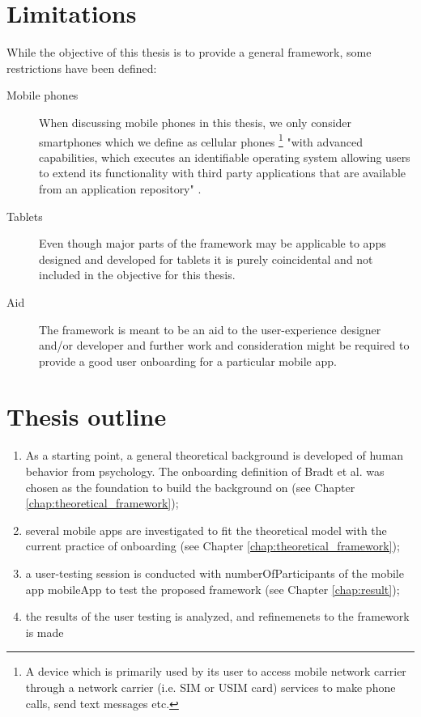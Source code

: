 \section{Limitations}
While the objective of this thesis is to provide a general framework, some restrictions have been defined:
\begin{description}
  \item[Mobile phones] When discussing mobile phones in this thesis, we only consider smartphones which we define as cellular phones \footnote{A device which is primarily used by its user to access mobile network carrier through a network carrier (i.e. SIM or USIM card) services to make phone calls, send text messages etc.} "with advanced capabilities, which executes an identifiable operating system allowing users to extend its functionality with third party applications that are available from an application repository" \cite{Theoharidou2012}.
  \item[Tablets] Even though major parts of the framework may be applicable to apps designed and developed for tablets it is purely coincidental and not included in the objective for this thesis.
  \item[Aid] The framework is meant to be an aid to the user-experience designer and/or developer and further work and consideration might be required to provide a good user onboarding for a particular mobile app.
\end{description}

\section{Thesis outline}
\begin{enumerate}
  \item As a starting point, a general theoretical background is developed of human behavior from psychology. The onboarding definition of Bradt et al. \cite{Bradt2009} was chosen as the foundation to build the background on (see Chapter \ref{chap:theoretical_framework});
  \item several mobile apps are investigated to fit the theoretical model with the current practice of onboarding (see Chapter \ref{chap:theoretical_framework});
  \item a user-testing session is conducted with numberOfParticipants of the mobile app mobileApp to test the proposed framework (see Chapter \ref{chap:result});
  \item the results of the user testing is analyzed, and refinemenets to the framework is made 
\end{enumerate}
